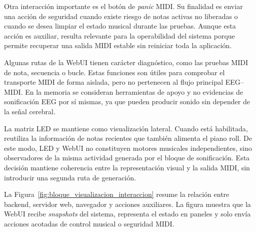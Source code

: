 \documentclass[../main.tex]{subfiles}
\begin{document}
Otra interacción importante es el botón de \textit{panic} MIDI. Su finalidad es enviar una acción de seguridad cuando existe riesgo de notas activas no liberadas o cuando se desea limpiar el estado musical durante las pruebas. Aunque esta acción es auxiliar, resulta relevante para la operabilidad del sistema porque permite recuperar una salida MIDI estable sin reiniciar toda la aplicación.

Algunas rutas de la WebUI tienen carácter diagnóstico, como las pruebas MIDI de nota, secuencia o bucle. Estas funciones son útiles para comprobar el transporte MIDI de forma aislada, pero no pertenecen al flujo principal EEG--MIDI. En la memoria se consideran herramientas de apoyo y no evidencias de sonificación EEG por sí mismas, ya que pueden producir sonido sin depender de la señal cerebral.

La matriz LED se mantiene como visualización lateral. Cuando está habilitada, reutiliza la información de notas recientes que también alimenta el piano roll. De este modo, LED y WebUI no constituyen motores musicales independientes, sino observadores de la misma actividad generada por el bloque de sonificación. Esta decisión mantiene coherencia entre la representación visual y la salida MIDI, sin introducir una segunda ruta de generación.

La Figura~\ref{fig:bloque_visualizacion_interaccion} resume la relación entre backend, servidor web, navegador y acciones auxiliares. La figura muestra que la WebUI recibe \textit{snapshots} del sistema, representa el estado en paneles y solo envía acciones acotadas de control musical o seguridad MIDI.
\end{document}
